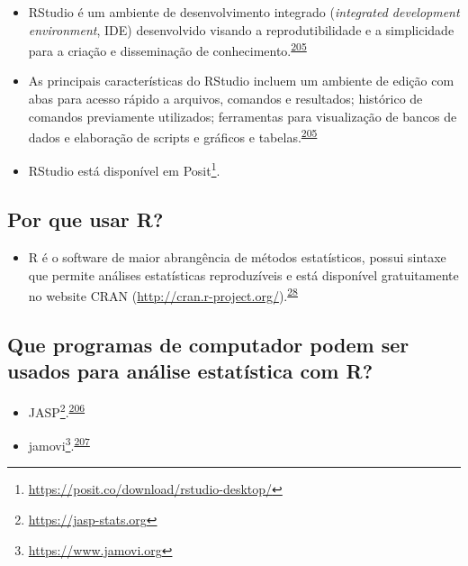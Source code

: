 \documentclass[
  a4paper,
]{book}
\providecommand{\tightlist}{%
  \setlength{\itemsep}{0pt}\setlength{\parskip}{0pt}}
\renewcommand{\href}[2]{#2\footnote{\url{#1}}}
\begin{document}
\begin{itemize}
\item
  RStudio é um ambiente de desenvolvimento integrado (\emph{integrated development environment}, IDE) desenvolvido visando a reprodutibilidade e a simplicidade para a criação e disseminação de conhecimento.\textsuperscript{\protect\hyperlink{ref-racine2011}{205}}
\item
  As principais características do RStudio incluem um ambiente de edição com abas para acesso rápido a arquivos, comandos e resultados; histórico de comandos previamente utilizados; ferramentas para visualização de bancos de dados e elaboração de scripts e gráficos e tabelas.\textsuperscript{\protect\hyperlink{ref-racine2011}{205}}
\item
  RStudio está disponível em \href{https://posit.co/download/rstudio-desktop/}{Posit}.
\end{itemize}

\hypertarget{por-que-usar-r}{%
\subsection{Por que usar R?}\label{por-que-usar-r}}

\begin{itemize}
\tightlist
\item
  R é o software de maior abrangência de métodos estatísticos, possui sintaxe que permite análises estatísticas reproduzíveis e está disponível gratuitamente no website CRAN (\url{http://cran.r-project.org/}).\textsuperscript{\protect\hyperlink{ref-mair2016}{28}}
\end{itemize}

\hypertarget{que-programas-de-computador-podem-ser-usados-para-anuxe1lise-estatuxedstica-com-r}{%
\subsection{Que programas de computador podem ser usados para análise estatística com R?}\label{que-programas-de-computador-podem-ser-usados-para-anuxe1lise-estatuxedstica-com-r}}

\begin{itemize}
\item
  \href{https://jasp-stats.org}{JASP}.\textsuperscript{\protect\hyperlink{ref-love2019}{206}}
\item
  \href{https://www.jamovi.org}{jamovi}.\textsuperscript{\protect\hyperlink{ref-sahin2020}{207}}
\end{itemize}
\end{document}
